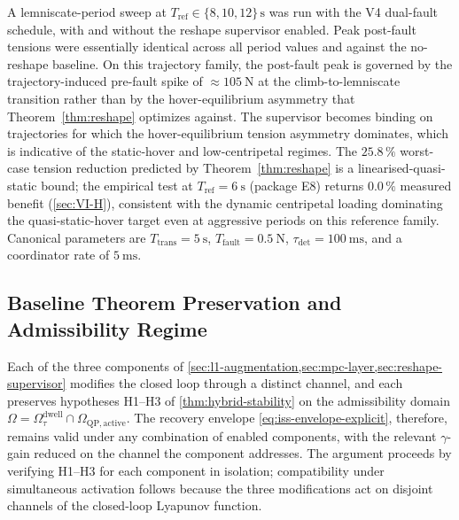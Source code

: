 A lemniscate-period sweep at $T_{\mathrm{ref}} \in \{8, 10, 12\}\,\mathrm{s}$ was run with the V4 dual-fault schedule, with and without the reshape supervisor enabled. Peak post-fault tensions were essentially identical across all period values and against the no-reshape baseline. On this trajectory family, the post-fault peak is governed by the trajectory-induced pre-fault spike of $\approx \SI{105}{\newton}$ at the climb-to-lemniscate transition rather than by the hover-equilibrium asymmetry that Theorem~\ref{thm:reshape} optimizes against. The supervisor becomes binding on trajectories for which the hover-equilibrium tension asymmetry dominates, which is indicative of the static-hover and low-centripetal regimes. The $25.8\,\%$ worst-case tension reduction predicted by Theorem~\ref{thm:reshape} is a linearised-quasi-static bound; the empirical test at $T_{\mathrm{ref}}=\SI{6}{\second}$ (package E8) returns $0.0\,\%$ measured benefit (\cref{sec:VI-H}), consistent with the dynamic centripetal loading dominating the quasi-static-hover target even at aggressive periods on this reference family. Canonical parameters are $T_{\mathrm{trans}} = \SI{5}{\second}$, $T_{\mathrm{fault}} = \SI{0.5}{\newton}$, $\tau_{\mathrm{det}} = \SI{100}{\milli\second}$, and a coordinator rate of $\SI{5}{\milli\second}$.

\subsection{Baseline Theorem Preservation and Admissibility
Regime}
\label{sec:theorem-preservation}

Each of the three components of \cref{sec:l1-augmentation,sec:mpc-layer,sec:reshape-supervisor} modifies the closed loop through a distinct channel, and each preserves hypotheses H1--H3 of \cref{thm:hybrid-stability} on the admissibility domain $\Omega = \Omega_\tau^{\mathrm{dwell}} \cap \Omega_{\mathrm{QP, active}}$. The recovery envelope \eqref{eq:iss-envelope-explicit}, therefore, remains valid under any combination of enabled components, with the relevant $\gamma$-gain reduced on the channel the component addresses. The argument proceeds by verifying H1--H3 for each component in isolation; compatibility under simultaneous activation follows because the three modifications act on disjoint channels of the closed-loop Lyapunov function.

